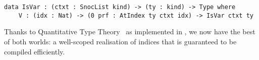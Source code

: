 \begin{Verbatim}
data IsVar : (ctxt : SnocList kind) -> (ty : kind) -> Type where
    V : (idx : Nat) -> (0 prf : AtIndex ty ctxt idx) -> IsVar ctxt ty
\end{Verbatim}

Thanks to Quantitative Type Theory~\cite{DBLP:conf/birthday/McBride16,DBLP:conf/lics/Atkey18}
as implemented in \Idris{},
we now have the best of both worlds: a well-scoped realisation of \DeBruijn{} indices
that is guaranteed to be compiled efficiently.


